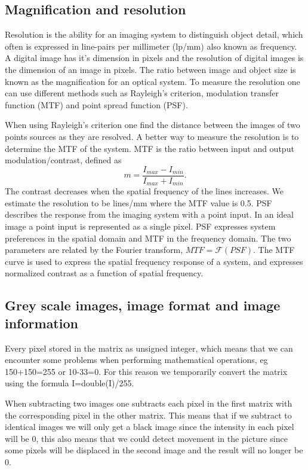 \subsection{Magnification and resolution}
Resolution is the ability for an imaging system to distinguish object detail, which often is expressed in line-pairs per millimeter (lp/mm) also known as frequency. %
A digital image has it's dimension in pixels and the resolution of digital images is the dimension of an image in pixels. The ratio between image and object size is known as the magnification for an optical system. To measure the resolution one can use different methods such as Rayleigh's criterion, modulation transfer function (MTF) and point spread function (PSF). 

When using Rayleigh's criterion one find the distance between the images of two points sources as they are resolved. A better way to measure the resolution is to determine the MTF of the system. MTF is the ratio between input and output modulation/contrast, defined as \[ m = \frac{I_{max}-I_{min}}{I_{max}+I_{min}}. \] The contrast decreases when the spatial frequency of the lines increases. We estimate the resolution to be lines/mm where the MTF value is 0.5. %
PSF describes the response from the imaging system with a point input. In an ideal image a point input is represented as a single pixel. PSF expresses system preferences in the spatial domain and MTF in the frequency domain. The two parameters are related by the Fourier transform, $ MTF = \mathcal{F}(PSF) $. The MTF curve is used to express the spatial frequency response of a system, and expresses normalized contrast as a function of spatial frequency. %

\subsection{Grey scale images, image format and image information}
Every pixel stored in the matrix as unsigned integer, which means that we can encounter some problems when performing mathematical operations, eg 150+150=255 or 10-33=0. For this reason we temporarily convert the matrix using the formula I=double(I)/255. 

When subtracting two images one subtracts each pixel in the first matrix with the corresponding pixel in the other matrix. %
This means that if we subtract to identical images we will only get a black image since the intensity in each pixel will be 0, this also means that we could detect movement in the picture since some pixels will be displaced in the second image and the result will no longer be 0.

